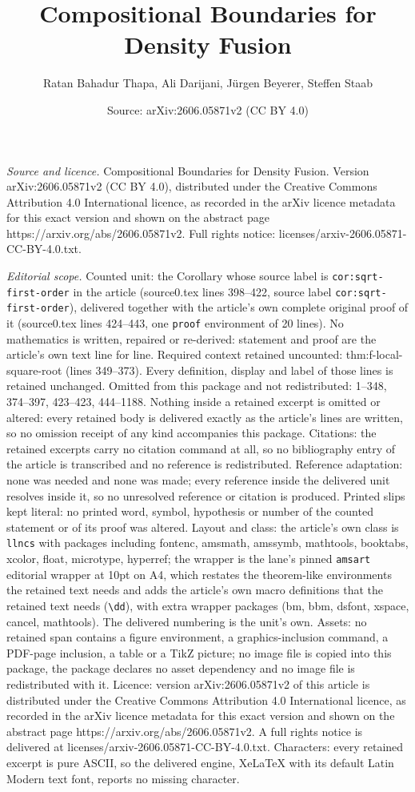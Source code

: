 \documentclass[10pt,a4paper]{amsart}
\title[Compositional Boundaries for Density Fusion]{Compositional Boundaries for Density Fusion}
\author{Ratan Bahadur Thapa, Ali Darijani, J\"urgen Beyerer, Steffen Staab}
\date{Source: arXiv:2606.05871v2 (CC BY 4.0)}
\begin{document}
\maketitle

\noindent\emph{Source and licence.} Compositional Boundaries for Density Fusion. Version arXiv:2606.05871v2 (CC BY 4.0), distributed under the Creative Commons Attribution 4.0 International licence, as recorded in the arXiv licence metadata for this exact version and shown on the abstract page https://arxiv.org/abs/2606.05871v2. Full rights notice: licenses/arxiv-2606.05871-CC-BY-4.0.txt.\par\smallskip

\noindent\textit{Editorial scope.} Counted unit: the Corollary whose source label is \texttt{cor:sqrt-first-order} in the article (source0.tex lines 398--422, source label \texttt{cor:sqrt-first-order}), delivered together with the article's own complete original proof of it (source0.tex lines 424--443, one \texttt{proof} environment of 20 lines). No mathematics is written, repaired or re-derived: statement and proof are the article's own text line for line. Required context retained uncounted: thm:f-local-square-root (lines 349--373). Every definition, display and label of those lines is retained unchanged. Omitted from this package and not redistributed: 1--348, 374--397, 423--423, 444--1188. Nothing inside a retained excerpt is omitted or altered: every retained body is delivered exactly as the article's lines are written, so no omission receipt of any kind accompanies this package. Citations: the retained excerpts carry no citation command at all, so no bibliography entry of the article is transcribed and no reference is redistributed. Reference adaptation: none was needed and none was made; every reference inside the delivered unit resolves inside it, so no unresolved reference or citation is produced. Printed slips kept literal: no printed word, symbol, hypothesis or number of the counted statement or of its proof was altered. Layout and class: the article's own class is \texttt{llncs} with packages including fontenc, amsmath, amssymb, mathtools, booktabs, xcolor, float, microtype, hyperref; the wrapper is the lane's pinned \texttt{amsart} editorial wrapper at 10pt on A4, which restates the theorem-like environments the retained text needs and adds the article's own macro definitions that the retained text needs (\texttt{\textbackslash dd}), with extra wrapper packages (bm, bbm, dsfont, xspace, cancel, mathtools). The delivered numbering is the unit's own. Assets: no retained span contains a figure environment, a graphics-inclusion command, a PDF-page inclusion, a table or a TikZ picture; no image file is copied into this package, the package declares no asset dependency and no image file is redistributed with it. Licence: version arXiv:2606.05871v2 of this article is distributed under the Creative Commons Attribution 4.0 International licence, as recorded in the arXiv licence metadata for this exact version and shown on the abstract page https://arxiv.org/abs/2606.05871v2. A full rights notice is delivered at licenses/arxiv-2606.05871-CC-BY-4.0.txt. Characters: every retained excerpt is pure ASCII, so the delivered engine, XeLaTeX with its default Latin Modern text font, reports no missing character.
\end{document}
